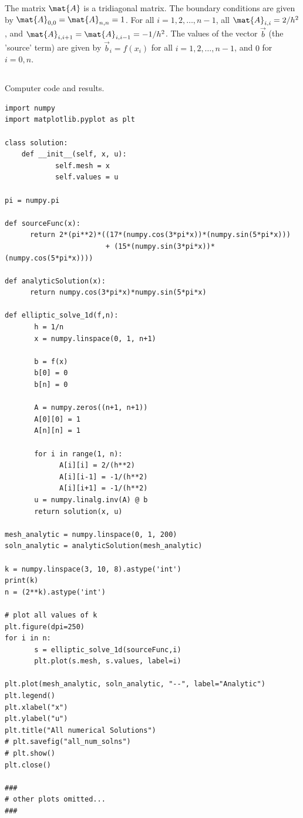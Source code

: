 \documentclass{template}
\begin{document}
The matrix $\mat{A}$ is a tridiagonal matrix. The boundary conditions are given by $\mat{A}_{0,0} = \mat{A}_{n,n} = 1$. For all $i=1,2,\dots,n-1$, all $\mat{A}_{i,i}=2/h^2$, and $\mat{A}_{i,i+1} = \mat{A}_{i,i-1} = -1/h^2$. The values of the vector $\vec{b}$ (the 'source' term) are given by $\vec{b}_i = f(x_i)$ for all $i=1,2,\dots,n-1$, and $0$ for $i=0, n$.

\subsection{} Computer code and results.

\begin{verbatim}
import numpy
import matplotlib.pyplot as plt

class solution:
    def __init__(self, x, u):
            self.mesh = x
            self.values = u

pi = numpy.pi

def sourceFunc(x):
      return 2*(pi**2)*((17*(numpy.cos(3*pi*x))*(numpy.sin(5*pi*x)))  
                        + (15*(numpy.sin(3*pi*x))*(numpy.cos(5*pi*x))))

def analyticSolution(x):
      return numpy.cos(3*pi*x)*numpy.sin(5*pi*x)
      
def elliptic_solve_1d(f,n):
       h = 1/n
       x = numpy.linspace(0, 1, n+1)

       b = f(x)
       b[0] = 0
       b[n] = 0

       A = numpy.zeros((n+1, n+1))
       A[0][0] = 1
       A[n][n] = 1
       
       for i in range(1, n):
             A[i][i] = 2/(h**2)
             A[i][i-1] = -1/(h**2)
             A[i][i+1] = -1/(h**2)
       u = numpy.linalg.inv(A) @ b
       return solution(x, u)

mesh_analytic = numpy.linspace(0, 1, 200)
soln_analytic = analyticSolution(mesh_analytic)

k = numpy.linspace(3, 10, 8).astype('int')
print(k)
n = (2**k).astype('int')

# plot all values of k
plt.figure(dpi=250)
for i in n:
       s = elliptic_solve_1d(sourceFunc,i)
       plt.plot(s.mesh, s.values, label=i)

plt.plot(mesh_analytic, soln_analytic, "--", label="Analytic")
plt.legend()
plt.xlabel("x")
plt.ylabel("u")
plt.title("All numerical Solutions")
# plt.savefig("all_num_solns")
# plt.show()
plt.close()

###
# other plots omitted...
###
\end{verbatim}
\end{document}
